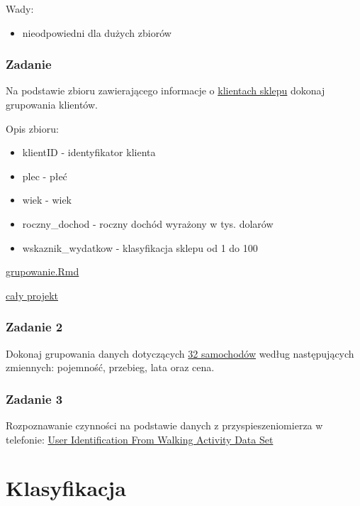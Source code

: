 \documentclass[]{book}
\providecommand{\tightlist}{%
  \setlength{\itemsep}{0pt}\setlength{\parskip}{0pt}}
\begin{document}
Wady:

\begin{itemize}
\tightlist
\item
  nieodpowiedni dla dużych zbiorów
\end{itemize}

\subsection{Zadanie}\label{zadanie-2}

Na podstawie zbioru zawierającego informacje o
\href{data/klienci.csv}{klientach sklepu} dokonaj grupowania klientów.

Opis zbioru:

\begin{itemize}
\tightlist
\item
  klientID - identyfikator klienta
\item
  plec - płeć
\item
  wiek - wiek
\item
  roczny\_dochod - roczny dochód wyrażony w tys. dolarów
\item
  wskaznik\_wydatkow - klasyfikacja sklepu od 1 do 100
\end{itemize}

\href{res/grupowanie.Rmd}{grupowanie.Rmd}

\href{res/adr.zip}{cały projekt}

\subsection{Zadanie 2}\label{zadanie-2-1}

Dokonaj grupowania danych dotyczących \href{data/auta.csv}{32
samochodów} według następujących zmiennych: pojemność, przebieg, lata
oraz cena.

\subsection{Zadanie 3}\label{zadanie-3}

Rozpoznawanie czynności na podstawie danych z przyspieszeniomierza w
telefonie:
\href{http://archive.ics.uci.edu/ml/datasets/User+Identification+From+Walking+Activity\#}{User
Identification From Walking Activity Data Set}

\chapter{Klasyfikacja}\label{klasyfikacja}
\end{document}
